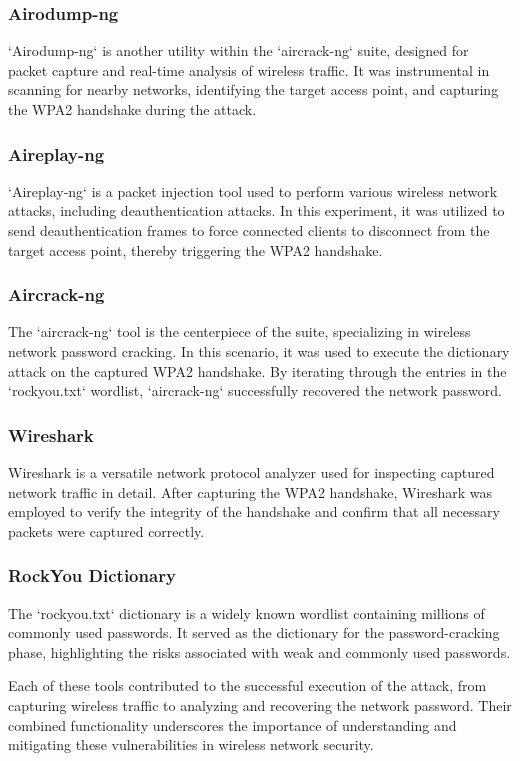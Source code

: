 \subsubsection{Airodump-ng}
`Airodump-ng` is another utility within the `aircrack-ng` suite, designed for packet capture and real-time analysis of wireless traffic. It was instrumental in scanning for nearby networks, identifying the target access point, and capturing the WPA2 handshake during the attack.

\subsubsection{Aireplay-ng}
`Aireplay-ng` is a packet injection tool used to perform various wireless network attacks, including deauthentication attacks. In this experiment, it was utilized to send deauthentication frames to force connected clients to disconnect from the target access point, thereby triggering the WPA2 handshake.

\subsubsection{Aircrack-ng}
The `aircrack-ng` tool is the centerpiece of the suite, specializing in wireless network password cracking. In this scenario, it was used to execute the dictionary attack on the captured WPA2 handshake. By iterating through the entries in the `rockyou.txt` wordlist, `aircrack-ng` successfully recovered the network password.

\subsubsection{Wireshark}
Wireshark is a versatile network protocol analyzer used for inspecting captured network traffic in detail. After capturing the WPA2 handshake, Wireshark was employed to verify the integrity of the handshake and confirm that all necessary packets were captured correctly.

\subsubsection{RockYou Dictionary}
The `rockyou.txt` dictionary is a widely known wordlist containing millions of commonly used passwords. It served as the dictionary for the password-cracking phase, highlighting the risks associated with weak and commonly used passwords.

Each of these tools contributed to the successful execution of the attack, from capturing wireless traffic to analyzing and recovering the network password. Their combined functionality underscores the importance of understanding and mitigating these vulnerabilities in wireless network security.


